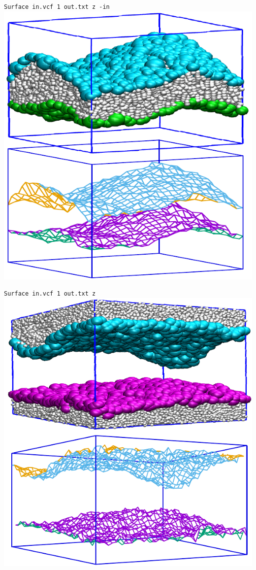 \begin{minipage}{0.45\textwidth}
  \centering
  \texttt{Surface in.vcf 1 out.txt z -in}
  \includegraphics[width=\textwidth]{Surface-bilayer.pdf}
\end{minipage}
\hfill
\begin{minipage}{0.45\textwidth}
  \texttt{Surface in.vcf 1 out.txt z}
  \centering
  \includegraphics[width=\textwidth]{Surface-brush.pdf}
\end{minipage}

